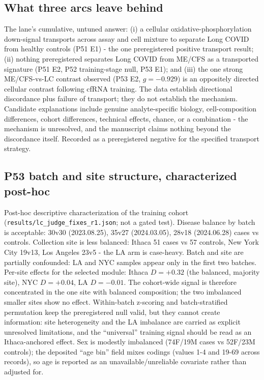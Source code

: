 \documentclass[11pt,a4paper]{article}
\begin{document}
\subsection{What three arcs leave behind}
The lane's cumulative, untuned answer: (i) a cellular oxidative-phosphorylation
down-signal transports across assay and cell mixture to separate Long COVID
from healthy controls (P51 E1) - the one preregistered positive transport
result; (ii) nothing preregistered separates Long COVID from ME/CFS as a
transported signature (P51 E2, P52 training-stage null, P53 E1); and (iii)
the one strong ME/CFS-vs-LC contrast observed (P53 E2, $g=-0.929$) is an
oppositely directed cellular contrast following cfRNA training. The data
establish directional discordance plus failure of transport; they do not
establish the mechanism. Candidate explanations include genuine
analyte-specific biology, cell-composition differences, cohort differences,
technical effects, chance, or a combination - the mechanism is unresolved,
and the manuscript claims nothing beyond the discordance itself. Recorded as
a preregistered negative for the specified transport strategy.


\subsection{P53 batch and site structure, characterized post-hoc}
\label{sec:p53conf}
Post-hoc descriptive characterization of the training cohort
(\texttt{results/lc\_judge\_fixes\_r1.json}; not a gated test). Disease
balance by batch is acceptable: 30v30 (2023.08.25), 35v27 (2024.03.05),
28v18 (2024.06.28) cases vs controls. Collection site is less balanced:
Ithaca 51 cases vs 57 controls, New York City 19v13,
Los Angeles 23v5 - the LA arm is case-heavy. Batch and site are
partially confounded: LA and NYC samples appear only in the first two
batches. Per-site effects for the selected module: Ithaca $D=+0.32$ (the
balanced, majority site), NYC $D=+0.04$, LA $D=-0.01$. The cohort-wide
signal is therefore concentrated in the one site with balanced composition;
the two imbalanced smaller sites show no effect. Within-batch z-scoring and
batch-stratified permutation keep the preregistered null valid, but they
cannot create information: site heterogeneity and the LA imbalance are
carried as explicit unresolved limitations, and the ``universal'' training
signal should be read as an Ithaca-anchored effect. Sex is modestly
imbalanced (74F/19M cases vs 52F/23M controls); the deposited ``age bin''
field mixes codings (values 1-4 and 19-69 across records), so age is
reported as an unavailable/unreliable covariate rather than adjusted for.
\end{document}
